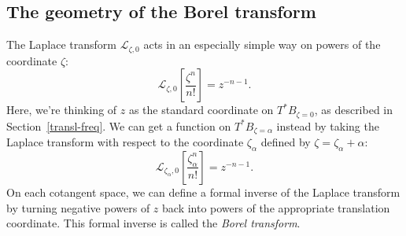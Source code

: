 \documentclass{article}
\theoremstyle{definition}
\newcommand{\fracderiv}[3]{\partial^{#1}_{#2, #3}}
\newcommand{\laplace}{\mathcal{L}}
\theoremstyle{plain}
\begin{document}




\subsection{The geometry of the Borel transform}\label{sec:geometry_borel}
The Laplace transform $\laplace_{\zeta, 0}$ acts in an especially simple way on powers of the coordinate $\zeta$:
\[ \laplace_{\zeta, 0}\left[\frac{\zeta^n}{n!}\right] = z^{-n-1}. \]
Here, we're thinking of $z$ as the standard coordinate on $T^*B_{\zeta = 0}$, as described in Section~\ref{transl-freq}. We can get a function on $T^*B_{\zeta = \alpha}$ instead by taking the Laplace transform with respect to the coordinate $\zeta_\alpha$ defined by $\zeta = \zeta_\alpha + \alpha$:
\[ \laplace_{\zeta_\alpha, 0}\left[\frac{\zeta_\alpha^n}{n!}\right] = z^{-n-1}. \]
On each cotangent space, we can define a formal inverse of the Laplace transform by turning negative powers of $z$ back into powers of the appropriate translation coordinate. This formal inverse is called the {\em Borel transform}.
\end{document}
